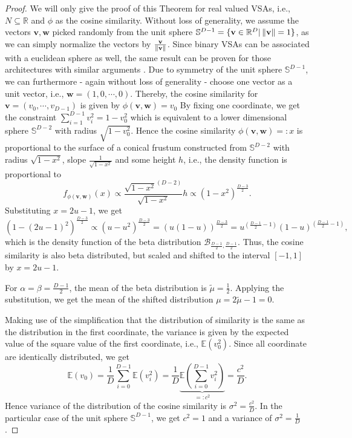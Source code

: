 \begin{proof}
	We will only give the proof of this Theorem for real valued \acp{VSA}, i.e., $N \subseteq \mathbb{R}$ and $\phi$ as the cosine similarity.
	Without loss of generality, we assume the vectors $ \mathbf{v}, \mathbf{w}$ picked randomly from the unit sphere $\mathbb{S}^{D-1} = \{ \mathbf{v} \in \mathbb{R}^{D} | \left\|  \mathbf{v} \right\| = 1 \}$, as we can simply normalize the vectors by $\frac{ \mathbf{v}}{\left\|  \mathbf{v} \right\|}$.
    Since binary \acp{VSA} can be associated with a euclidean sphere as well, the same result can be proven for those architectures with similar arguments \parencite[see][for details]{Kanerva1988}.
	Due to symmetry of the unit sphere $\mathbb{S}^{D-1}$, we can furthermore - again without loss of generality - choose one vector as a unit vector, i.e., $ \mathbf{w}=\left(1, 0 , \cdots, 0\right)$.
	Thereby, the cosine similarity for $ \mathbf{v}=\left(v_{0}, \cdots, v_{D-1}\right)$ is given by $\phi\left( \mathbf{v}, \mathbf{w}\right) = v_{0}$
	By fixing one coordinate, we get the constraint $\sum_{i=1}^{D-1} v_{i}^{2} = 1-v_{0}^{2}$ which is equivalent to a lower dimensional sphere $\mathbb{S}^{D-2}$ with radius $\sqrt{1-v_{0}^2}$.
	Hence the cosine similarity $\phi\left( \mathbf{v}, \mathbf{w}\right)=:x$ is proportional to the surface of a conical frustum constructed from $\mathbb{S}^{D-2}$ with radius $\sqrt{1-x^{2}}$, slope $\frac{1}{\sqrt{1-x^{2}}}$ and some height $h$, i.e., the density function is proportional to
	\[
	f_{\phi( \mathbf{v}, \mathbf{w})}(x) \propto \frac{\sqrt{1-x^{2}}^{(D-2)}}{\sqrt{1-x^{2}}} h \propto \left(1-x^{2}\right)^{\frac{D-3}{2}}.
	\]
	Substituting $x=2u-1$, we get
	\[
	\left(1-\left(2u-1\right)^{2}\right)^{\frac{D-3}{2}} \propto \left(u-u^2\right)^{\frac{D-3}{2}} = \left(u \left(1-u\right)\right)^{\frac{D-3}{2}} = u^{\left(\frac{D-1}{2}-1\right)} \left(1-u\right)^{\left(\frac{D-1}{2}-1\right)},
	\]
	which is the density function of the beta distribution $\mathcal{B}_{\frac{D-1}{2},\frac{D-1}{2}}$.
	Thus, the cosine similarity is also beta distributed, but scaled and shifted to the interval $\left[-1,1\right]$ by $x=2u-1$.
    
	For $\alpha=\beta=\frac{D-1}{2}$, the mean of the beta distribution is $\tilde{\mu}=\frac{1}{2}$. Applying the substitution, we get the mean of the shifted distribution $\mu = 2\tilde{\mu }-1 = 0$.
    
	Making use of the simplification that the distribution of similarity is the same as the distribution in the first coordinate, the variance is given by the expected value of the square value of the first coordinate, i.e., $\mathbb{E}(v_{0}^{2})$.
	Since all coordinate are identically distributed, we get
	\[
	\mathbb{E}(v_{0}) = \frac{1}{D} \sum_{i=0}^{D-1} \mathbb{E}(v_{i}^2)= \frac{1}{D} \underbrace{\mathbb{E}\left(\sum_{i=0}^{D-1} v_{i}^2\right)}_{=:c^2}=\frac{c^2}{D}.
	\]
	Hence variance of the distribution of the cosine similarity is $\sigma^2=\frac{c^2}{D}$.
	In the particular case of the unit sphere $\mathbb{S}^{D-1}$, we get $c^{2}=1$ and a variance of $\sigma^2=\frac{1}{D}$.
    

\end{proof}
